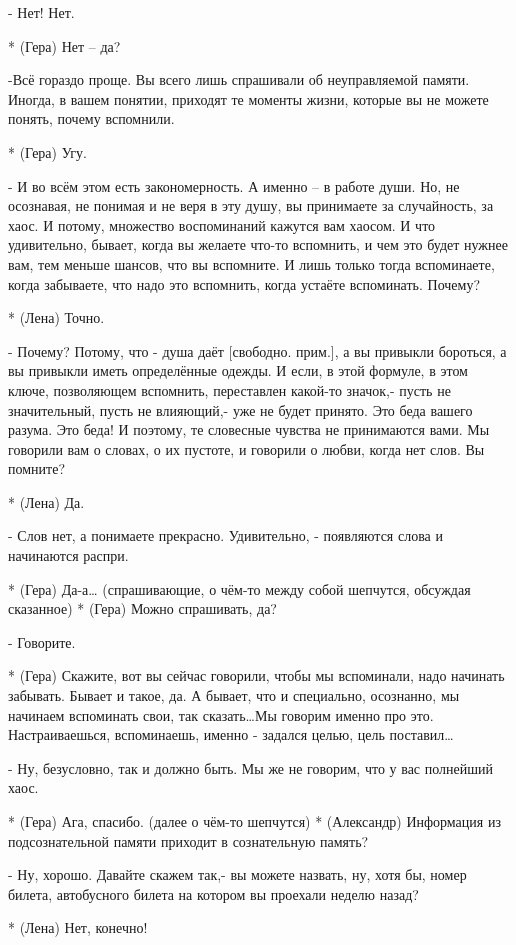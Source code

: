 - Нет! Нет. 

* (Гера) Нет – да?

-Всё гораздо проще. Вы всего лишь спрашивали об неуправляемой памяти. Иногда, в вашем понятии, приходят те моменты жизни, которые вы не можете понять, почему вспомнили.

* (Гера) Угу.

- И во всём этом есть закономерность. А именно – в работе души. Но, не осознавая, не понимая и не веря в эту душу, вы принимаете за случайность, за хаос. И потому,  множество воспоминаний кажутся вам хаосом. И что удивительно, бывает, когда вы желаете что-то вспомнить, и чем это будет нужнее вам, тем меньше шансов, что вы вспомните. И лишь только тогда вспоминаете, когда забываете, что надо это вспомнить, когда устаёте вспоминать. Почему?

* (Лена) Точно.

- Почему? Потому, что - душа даёт [свободно. прим.], а вы привыкли бороться, а вы привыкли иметь определённые одежды. И если, в этой формуле, в этом ключе, позволяющем вспомнить, переставлен какой-то значок,- пусть не значительный, пусть не влияющий,- уже не будет принято. Это беда вашего разума. Это беда! И поэтому, те словесные чувства не принимаются вами. Мы говорили вам о словах, о их пустоте, и говорили о любви, когда нет слов. Вы помните?

* (Лена) Да.

- Слов нет, а понимаете прекрасно. Удивительно, -  появляются слова и начинаются распри.

* (Гера) Да-а…
(спрашивающие, о чём-то между собой шепчутся, обсуждая сказанное)
* (Гера) Можно спрашивать, да?

- Говорите.

* (Гера) Скажите, вот вы сейчас говорили, чтобы мы вспоминали, надо начинать забывать. Бывает и такое, да. А бывает, что и специально, осознанно, мы начинаем вспоминать свои, так сказать…Мы говорим именно про это. Настраиваешься, вспоминаешь, именно - задался целью, цель поставил…

- Ну, безусловно, так и должно быть. Мы же не говорим, что у вас полнейший хаос.

* (Гера) Ага, спасибо. (далее о чём-то шепчутся)
* (Александр) Информация из подсознательной памяти приходит в сознательную память?

- Ну, хорошо. Давайте скажем так,- вы можете назвать, ну, хотя бы, номер билета, автобусного билета на котором вы проехали неделю назад?

* (Лена) Нет, конечно!

